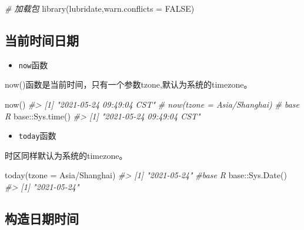 \documentclass[
]{book}
\newenvironment{Shaded}{\begin{snugshade}}{\end{snugshade}}
\newcommand{\AttributeTok}[1]{\textcolor[rgb]{0.77,0.63,0.00}{#1}}
\newcommand{\CommentTok}[1]{\textcolor[rgb]{0.56,0.35,0.01}{\textit{#1}}}
\newcommand{\ConstantTok}[1]{\textcolor[rgb]{0.00,0.00,0.00}{#1}}
\newcommand{\FunctionTok}[1]{\textcolor[rgb]{0.00,0.00,0.00}{#1}}
\newcommand{\NormalTok}[1]{#1}
\newcommand{\SpecialCharTok}[1]{\textcolor[rgb]{0.00,0.00,0.00}{#1}}
\newcommand{\StringTok}[1]{\textcolor[rgb]{0.31,0.60,0.02}{#1}}
\providecommand{\tightlist}{%
  \setlength{\itemsep}{0pt}\setlength{\parskip}{0pt}}
\begin{document}
\begin{Shaded}
\begin{Highlighting}[]
\CommentTok{\# 加载包}
\FunctionTok{library}\NormalTok{(lubridate,}\AttributeTok{warn.conflicts =} \ConstantTok{FALSE}\NormalTok{)}
\end{Highlighting}
\end{Shaded}

\hypertarget{get-current-datetime}{%
\subsection{当前时间日期}\label{get-current-datetime}}

\begin{itemize}
\tightlist
\item
  \texttt{now}函数
\end{itemize}

now()函数是当前时间，只有一个参数tzone,默认为系统的timezone。

\begin{Shaded}
\begin{Highlighting}[]
\FunctionTok{now}\NormalTok{()}
\CommentTok{\#\textgreater{} [1] "2021{-}05{-}24 09:49:04 CST"}
\CommentTok{\# now(tzone = \textquotesingle{}Asia/Shanghai\textquotesingle{})}
\CommentTok{\# base R}
\NormalTok{base}\SpecialCharTok{::}\FunctionTok{Sys.time}\NormalTok{()}
\CommentTok{\#\textgreater{} [1] "2021{-}05{-}24 09:49:04 CST"}
\end{Highlighting}
\end{Shaded}

\begin{itemize}
\tightlist
\item
  \texttt{today}函数
\end{itemize}

时区同样默认为系统的timezone。

\begin{Shaded}
\begin{Highlighting}[]
\FunctionTok{today}\NormalTok{(}\AttributeTok{tzone =} \StringTok{\textquotesingle{}Asia/Shanghai\textquotesingle{}}\NormalTok{)}
\CommentTok{\#\textgreater{} [1] "2021{-}05{-}24"}
\CommentTok{\#base R}
\NormalTok{base}\SpecialCharTok{::}\FunctionTok{Sys.Date}\NormalTok{()}
\CommentTok{\#\textgreater{} [1] "2021{-}05{-}24"}
\end{Highlighting}
\end{Shaded}

\hypertarget{make-datetime}{%
\subsection{构造日期时间}\label{make-datetime}}
\end{document}
